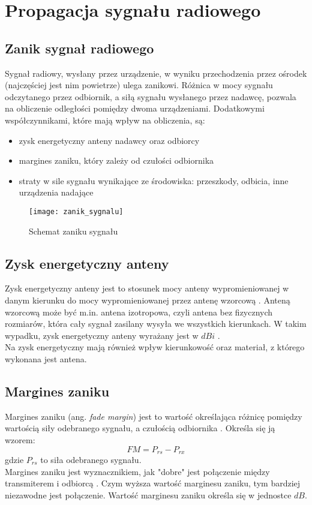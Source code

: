 \chapter{Propagacja sygnału radiowego}
\label{cha:teoria}
\section{Zanik sygnał radiowego}
Sygnał radiowy, wysłany przez urządzenie, w wyniku przechodzenia przez ośrodek (najczęściej jest nim powietrze) ulega zanikowi. \cite{ST} Różnica w mocy sygnału odczytanego przez odbiornik, a siłą sygnału wysłanego przez nadawcę, pozwala na obliczenie odległości pomiędzy dwoma urządzeniami. Dodatkowymi współczynnikami, które mają wpływ na obliczenia, są:
\begin{itemize}
	\item zysk energetyczny anteny nadawcy oraz odbiorcy
	\item margines zaniku, który zależy od czułości odbiornika
	\item straty w sile sygnału wynikające ze środowiska: przeszkody, odbicia, inne urządzenia nadające
\end{itemize}
\begin{figure}[H]			
	\centering
	\caption{Schemat zaniku sygnału}
	\texttt{[image: zanik\_sygnalu]}
\end{figure}
\section{Zysk energetyczny anteny}
Zysk energetyczny anteny jest to stosunek mocy anteny wypromieniowanej w danym kierunku do mocy wypromieniowanej przez antenę wzorcową \cite{ML}. Anteną wzorcową może być m.in. antena izotropowa, czyli antena bez fizycznych rozmiarów, która cały sygnał zasilany wysyła we wszystkich kierunkach. W takim wypadku, zysk energetyczny anteny wyrażany jest w $dBi$ \cite{AG}.\\
Na zysk energetyczny mają również wpływ kierunkowość oraz materiał, z którego wykonana jest antena.
\section{Margines zaniku}
Margines zaniku (ang. \textit{fade margin}) jest to wartość określająca różnicę pomiędzy wartością siły odebranego sygnału, a czułością odbiornika \cite{RFM}. Określa się ją wzorem:
\begin{equation}
FM = P_{rs} - P_{rx}
\end{equation}
gdzie $P_{rs}$ to siła odebranego sygnału.\\
Margines zaniku jest wyznacznikiem, jak "dobre" jest połączenie między transmiterem i odbiorcą \cite{FMC}. Czym wyższa wartość marginesu zaniku, tym bardziej niezawodne jest połączenie.
Wartość marginesu zaniku określa się w jednostce $dB$.
